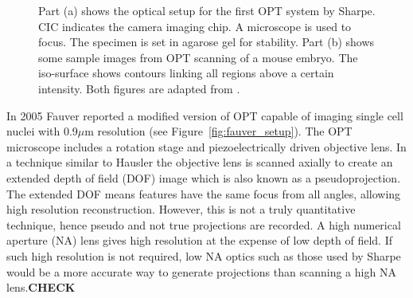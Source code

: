\documentclass[12pt]{article}
\begin{document}
\begin{figure}[H]
\centering
{}
\caption{Part (a) shows the optical setup for the first OPT system by Sharpe. CIC indicates the camera imaging chip. A microscope is used to focus. The specimen is set in agarose gel for stability. Part (b) shows some sample images from OPT scanning of a mouse embryo. The iso-surface shows contours linking all regions above a certain intensity. Both figures are adapted from \cite{Sharpe:2002jp}.}
\label{fig:SharpeOPT}
\end{figure}




In 2005 Fauver reported a modified version of OPT capable of imaging single cell nuclei with 0.9$\mu$m resolution (see Figure~\ref{fig:fauver_setup}).\cite{Fauver:2005} The OPT microscope includes a rotation stage and  piezoelectrically driven objective lens. In a technique similar to Hausler \cite{hausler1972method} the objective lens is scanned axially to create an extended depth of field (DOF) image which is also known as a pseudoprojection. The extended DOF means features have the same focus from all angles, allowing high resolution reconstruction. However, this is not a truly quantitative technique, hence pseudo and not true projections are recorded. A high numerical aperture (NA) lens gives high resolution at the expense of low depth of field. If such high resolution is not required, low NA optics such as those used by Sharpe would be a more accurate way to generate  projections than scanning a high NA lens.\textbf{CHECK} 
\end{document}
